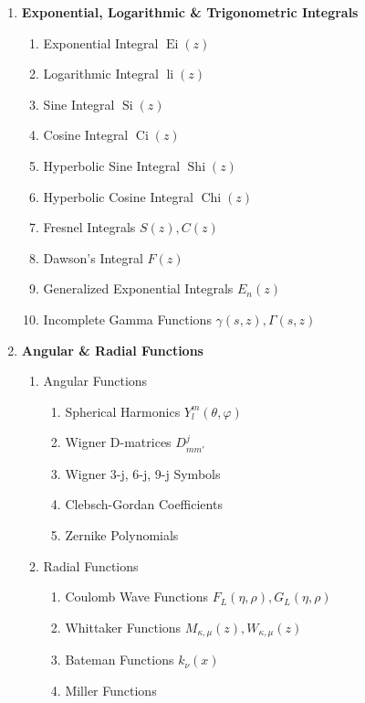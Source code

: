 \begin{enumerate}[label=\textbf{\arabic*.}]
	\item \textbf{Exponential, Logarithmic \& Trigonometric Integrals}
	\begin{enumerate}[label=\textbf{\alph*)}]
		\item Exponential Integral $\operatorname{Ei}(z)$
		\item Logarithmic Integral $\operatorname{li}(z)$
		\item Sine Integral $\operatorname{Si}(z)$
		\item Cosine Integral $\operatorname{Ci}(z)$
		\item Hyperbolic Sine Integral $\operatorname{Shi}(z)$
		\item Hyperbolic Cosine Integral $\operatorname{Chi}(z)$
		\item Fresnel Integrals $S(z), C(z)$
		\item Dawson's Integral $F(z)$
		\item Generalized Exponential Integrals $E_n(z)$
		\item Incomplete Gamma Functions $\gamma(s,z), \Gamma(s,z)$
	\end{enumerate}
	
	\item \textbf{Angular \& Radial Functions}
	\begin{enumerate}[label=\textbf{\alph*)}]
		\item Angular Functions
		\begin{enumerate}[label=\textbf{\roman*)}]
			\item Spherical Harmonics $Y_l^m(\theta,\varphi)$
			\item Wigner D-matrices $D_{mm'}^j$
			\item Wigner 3-j, 6-j, 9-j Symbols
			\item Clebsch-Gordan Coefficients
			\item Zernike Polynomials
		\end{enumerate}
		\item Radial Functions
		\begin{enumerate}[label=\textbf{\roman*)}]
			\item Coulomb Wave Functions $F_L(\eta,\rho), G_L(\eta,\rho)$
			\item Whittaker Functions $M_{\kappa,\mu}(z), W_{\kappa,\mu}(z)$
			\item Bateman Functions $k_\nu(x)$
			\item Miller Functions
		\end{enumerate}
	\end{enumerate}
	

\end{enumerate}
